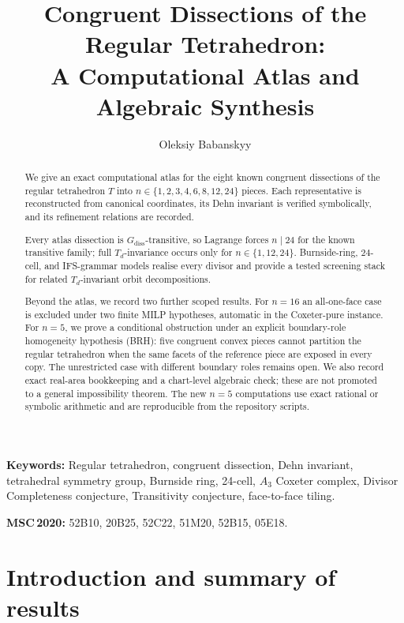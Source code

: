 \documentclass[11pt,a4paper]{article}
\title{%
  Congruent Dissections of the Regular Tetrahedron:\\
  A Computational Atlas and Algebraic Synthesis}
\author{Oleksiy Babanskyy}
\date{}
\theoremstyle{plain}
\theoremstyle{definition}
\theoremstyle{remark}
\newcommand{\Td}{T_{\!d}}
\begin{document}
\pagestyle{plain}

\maketitle

\begin{abstract}
We give an exact computational atlas for the eight known congruent dissections
of the regular tetrahedron $T$ into
$n \in \{1,2,3,4,6,8,12,24\}$ pieces.  Each representative is reconstructed
from canonical coordinates, its Dehn invariant is verified symbolically, and
its refinement relations are recorded.

Every atlas dissection is $G_{\mathrm{diss}}$-transitive, so Lagrange forces
$n \mid 24$ for the known transitive family; full $\Td$-invariance occurs only
for $n\in\{1,12,24\}$.  Burnside-ring, $24$-cell, and IFS-grammar models
realise every divisor and provide a tested screening stack for related
$\Td$-invariant orbit decompositions.

Beyond the atlas, we record two further scoped results.  For $n=16$ an
all-one-face case is excluded under two finite MILP hypotheses, automatic in
the Coxeter-pure instance.  For $n=5$, we prove a conditional obstruction under an explicit boundary-role
homogeneity hypothesis (BRH): five congruent convex pieces cannot partition the
regular tetrahedron when the same facets of the reference piece are exposed in
every copy.  The unrestricted case with different boundary roles remains open.
We also record exact real-area bookkeeping and a chart-level algebraic check;
these are not promoted to a general impossibility theorem.  The new $n=5$
computations use exact rational or symbolic arithmetic and are reproducible
from the repository scripts.
\end{abstract}

\smallskip
{\small
\noindent\textbf{Keywords:}
Regular tetrahedron, congruent dissection, Dehn invariant, tetrahedral symmetry group,
Burnside ring, 24-cell, $A_3$ Coxeter complex, Divisor Completeness conjecture,
Transitivity conjecture, face-to-face tiling.

\smallskip
\noindent\textbf{MSC\,2020:}
52B10, 20B25, 52C22, 51M20, 52B15, 05E18.
}

\section{Introduction and summary of results}\label{sec:intro}
\end{document}
